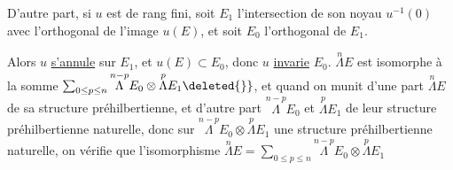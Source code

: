 D'autre part, si $u$ est de rang fini,   soit $E_{1}$ l'intersection de son noyau $u^{-1}(0)$ avec l'orthogonal de l'image $u(E)$, et soit $E_0$ l'orthogonal de $E_1$.

Alors $u$ \uline{s'annule} sur $E_1$, et $u(E)\subset E_0$, donc $u$ \uline{invarie} $E_0$. $\overset{n}{\Lambda}E$ est   isomorphe à la somme $\sum_{0\leq p\leq n}\overset{n-p}{\Lambda}E_0\otimes\overset{p}{\Lambda}E_1\deleted{\}}$, et quand on munit d'une  part $\overset{n}{\Lambda}E$ de sa structure préhilbertienne, et d'autre part $\overset{n-p}{\Lambda}E_0$ et $\overset{p}{\Lambda}E_1$ de leur structure préhilbertienne naturelle, donc sur $\overset{n-p}{\Lambda}E_0\otimes\overset{p}{\Lambda}E_1$ une structure préhilbertienne naturelle, on vérifie que l'isomorphisme $\overset{n}{\Lambda}E=\sum_{0\leq p\leq n}\overset{n-p}{\Lambda}E_0\otimes\overset{p}{\Lambda}E_1$
